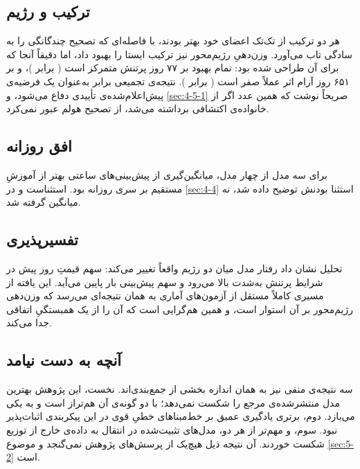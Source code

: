 \subsection*{ترکیب و رژیم}

هر دو ترکیب از تک‌تک اعضای خود بهتر بودند، با فاصله‌ای که تصحیح چندگانگی را به
سادگی تاب می‌آورد. وزن‌دهیِ رژیم‌محور نیز ترکیب ایستا را بهبود داد، اما دقیقاً
آنجا که برای آن طراحی شده بود: تمام بهبود بر ۷۷ روز پرتنش متمرکز است
( برابر )، و بر ۶۵۱ روز آرام اثر عملاً صفر است
( برابر ). نتیجه‌ی تجمیعی   برابر 
 به‌عنوان یک فرضیه‌ی پیش‌اعلام‌شده‌ی تأییدی دفاع می‌شود، و
\cref{sec:4-5-1} صریحاً نوشت که همین عدد اگر از خانواده‌ی اکتشافی برداشته
می‌شد، از تصحیح هولم عبور نمی‌کرد.

\subsection*{افق روزانه}

برای سه مدل از چهار مدل، میانگین‌گیری از پیش‌بینی‌های ساعتی بهتر از آموزشِ
مستقیم بر سری روزانه بود.  استثناست و در \cref{sec:4-4} استثنا
بودنش توضیح داده شد، نه میانگین گرفته شد.

\subsection*{تفسیرپذیری}

تحلیل  نشان داد رفتار مدل میان دو رژیم واقعاً تغییر می‌کند: سهم قیمتِ
روز پیش در شرایط پرتنش به‌شدت بالا می‌رود و سهم پیش‌بینی بار پایین می‌آید. این
یافته از مسیری کاملاً مستقل از آزمون‌های آماری به همان نتیجه‌ای می‌رسد که
وزن‌دهی رژیم‌محور بر آن استوار است، و همین هم‌گرایی است که آن را از یک همبستگیِ
اتفاقی جدا می‌کند.

\subsection*{آنچه به دست نیامد}

سه نتیجه‌ی منفی نیز به همان اندازه بخشی از جمع‌بندی‌اند. نخست، این پژوهش بهترین
مدل منتشرشده‌ی مرجع را شکست نمی‌دهد؛ با دو گونه‌ی آن هم‌تراز است و به یکی
می‌بازد. دوم، برتری یادگیری عمیق بر خط‌مبناهای خطیِ قوی در این پیکربندی
اثبات‌پذیر نبود. سوم، و مهم‌تر از هر دو، مدل‌های تثبیت‌شده در انتقال به داده‌ی
خارج از توزیع شکست خوردند. آن نتیجه ذیل هیچ‌یک از پرسش‌های پژوهش نمی‌گنجد و
موضوع \cref{sec:5-2} است.
